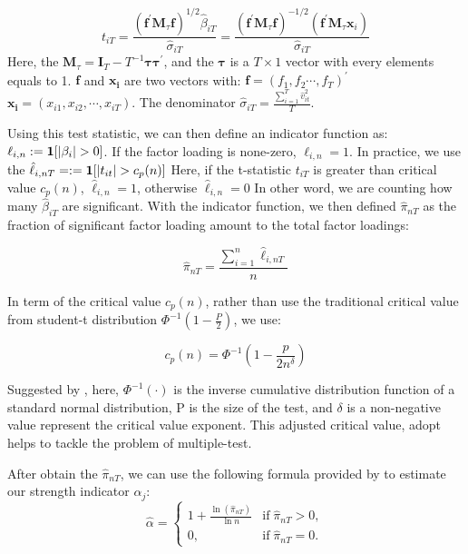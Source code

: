 \[t_{i T}=\frac{\left(\mathbf{f}^{\prime} \mathbf{M}_{\tau} \mathbf{f}\right)^{1 / 2} \hat{\beta}_{i T}}{\hat{\sigma}_{i T}}=\frac{\left(\mathbf{f}^{\prime} \mathbf{M}_{\tau} \mathbf{f}\right)^{-1 / 2}\left(\mathbf{f}^{\prime} \mathbf{M}_{\tau} \mathbf{x}_{i}\right)}{\hat{\sigma}_{i T}} \tag{3} \label{test_statistic} \]
Here, the $\mathbf{M}_{\tau} = \mathbf{I}_T - T^{-1}\mathbf{\tau}\mathbf{\tau^\prime}$, and the $\mathbf{\tau}$ is a $T\times 1$ vector with every elements equals to 1.
$\mathbf{f}$ and $\mathbf{x_i}$ are two vectors with: $\mathbf{f} = (f_1, f_2 \cdots, f_T)^{\prime}$   $\mathbf{x_i} = (x_{i1}, x_{i2}, \cdots, x_{iT})$.
The denominator $\hat{\sigma}_{iT} = \frac{\sum_{i=1}^{T} \hat{v}^2_{it} }{T}$.

Using this test statistic, we can then define an indicator function as: $\ell_{i,n} := {\bf1}[|\beta_i|>0]$.
If the factor loading is none-zero, $\ell_{i,n} = 1$.
In practice, we use the $\hat{\ell}_{i,nT} = := {\bf1}[|t_{it}|>c_p(n)]$
Here, if the t-statistic $t_{iT}$ is greater than critical value $c_p(n)$,  $\hat{\ell}_{i,n} = 1$, otherwise $\hat{\ell}_{i,n} = 0$
In other word, we are counting how many $\hat{\beta}_{iT}$ are significant.
With the indicator function, we then defined $\hat{\pi}_{nT}$ as the fraction of significant factor loading amount to the total factor loadings:

\[  \hat{\pi}_{nT} = \frac{\sum_{i=1}^n \hat{\ell}_{i,nT}}{n} \tag{4} \label{pi_function} \]


In term of the critical value $c_p(n)$, rather than use the traditional critical value from student-t distribution $\Phi^{-1}(1-\frac{P}{2})$, we use:

\[   c_p(n) = \Phi^{-1}(1 - \frac{p}{2n^\delta})   \tag{5} \label{critical_value_function} \]

Suggested by , here, $\Phi^{-1}(\cdot)$ is the inverse cumulative distribution function of a standard normal distribution, P is the size of the test, and $\delta$ is a non-negative value represent the critical value exponent. 
This adjusted critical value, adopt helps to tackle the problem of multiple-test.

After obtain the $\hat{\pi}_{nT}$, we can use the following formula provided by  to estimate our strength indicator $\alpha_j$:
\[ \hat{\alpha} = \begin{cases}
1+\frac{\ln(\hat{\pi}_{nT})}{\ln n} & \text{if}\; \hat{\pi}_{nT} > 0,\\
0, & \text{if}\; \hat{\pi}_{nT} = 0.
	\end{cases} \tag{6} \label{estimation_method} \]

